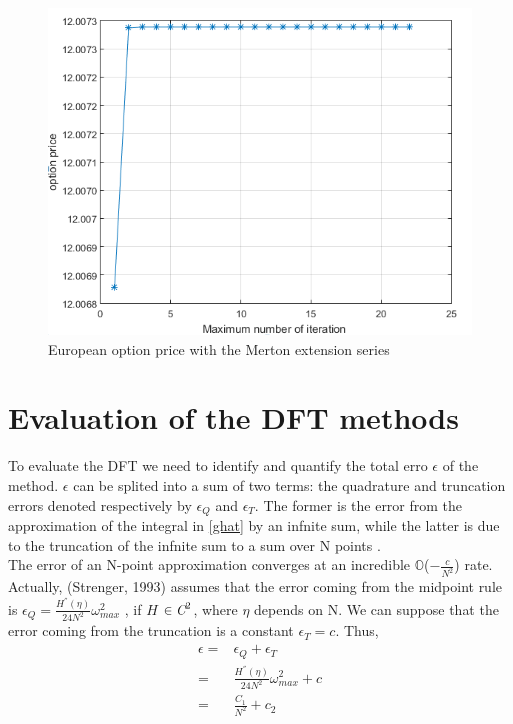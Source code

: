 \documentclass[12pt]{report}
\begin{document}
\begin{figure}[H]
\centering
\includegraphics{maxiteration.png} 
\caption{ European option price with the Merton extension series}
\end{figure}


\section{Evaluation of the DFT methods }

To evaluate the DFT we need to identify and quantify the total erro $\epsilon$ of the method.
 $\epsilon$ can be splited into a sum of two terms: the quadrature and truncation errors denoted respectively by $\epsilon_Q$ and $\epsilon_T$. The former is the error from the approximation of the integral in \eqref{ghat} by an infnite sum, while the latter is due to the truncation of the infnite sum to a sum over N points .\\

 The error of an N-point approximation converges at an incredible $\mathbb{O}$($-\frac{c}{N^2}$) rate. Actually, (Strenger, 1993)  assumes that the error coming from the midpoint rule is  $\epsilon_Q=\frac{H^{''}(\eta)}{24N^2} \omega_{max}^2$ , if 
 $H$ $\in  \emph{C}^2$, where $\eta$ depends on N. We can suppose that the error coming from the truncation is a constant $\epsilon_T=c$. 
Thus, 
\begin{align}
\epsilon=&\epsilon_Q+\epsilon_T \nonumber \\
=&\frac{H^{''}(\eta)}{24N^2} \omega_{max}^2+c \nonumber \\
=&\frac{C_1}{N^2}+c_2
\end{align}
\end{document}
